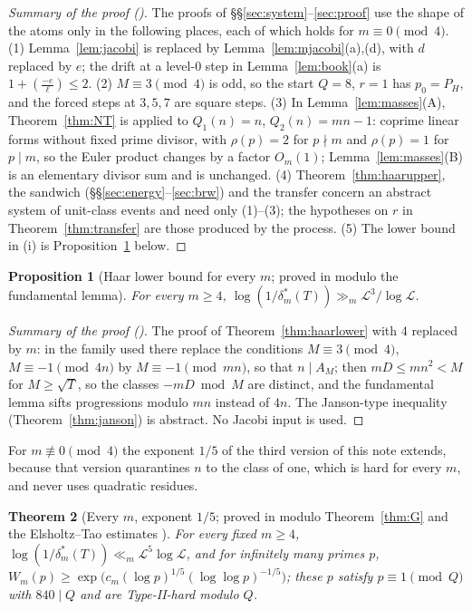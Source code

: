 \documentclass[11pt,reqno]{amsart}
\newtheorem{theorem}{Theorem}[section]
\newtheorem{proposition}[theorem]{Proposition}
\theoremstyle{definition}
\newcommand{\Lc}{\mathcal L}
\begin{document}
\begin{proof}[Summary of the proof {\rm(\cite[Thm.~3.1]{MN})}]
The proofs of \S\S\ref{sec:system}--\ref{sec:proof} use the shape of the atoms
only in the following places, each of which holds for $m\equiv0\pmod4$.
(1) Lemma~\ref{lem:jacobi} is replaced by Lemma~\ref{lem:mjacobi}(a),(d), with $d$
replaced by $e$; the drift at a level-$0$ step in Lemma~\ref{lem:book}(a) is
$1+(\frac{-e}\ell)\le2$.  (2) $M\equiv3\pmod4$ is odd, so the start $Q=8$, $r=1$ has
$p_0=P_H$, and the forced steps at $3,5,7$ are square steps.  (3) In
Lemma~\ref{lem:masses}(A), Theorem~\ref{thm:NT} is applied to $Q_1(n)=n$,
$Q_2(n)=mn-1$: coprime linear forms without fixed prime divisor, with
$\rho(p)=2$ for $p\nmid m$ and $\rho(p)=1$ for $p\mid m$, so the Euler product changes
by a factor $O_m(1)$; Lemma~\ref{lem:masses}(B) is an elementary divisor sum and is
unchanged.  (4) Theorem~\ref{thm:haarupper}, the sandwich
(\S\S\ref{sec:energy}--\ref{sec:brw}) and the transfer concern an abstract system of
unit-class events and need only (1)--(3); the hypotheses on $r$ in
Theorem~\ref{thm:transfer} are those produced by the process.  (5) The lower
bound in (i) is Proposition~\ref{prop:mlower} below.
\end{proof}

\begin{proposition}[Haar lower bound for every $m$; proved in {\cite{MN}} modulo the fundamental lemma]\label{prop:mlower}
For every $m\ge4$, $\log(1/\delta_m^*(T))\gg_m\Lc^3/\log\Lc$.
\end{proposition}

\begin{proof}[Summary of the proof {\rm(\cite[Prop.~3.2]{MN})}]
The proof of Theorem~\ref{thm:haarlower} with $4$ replaced by $m$: in the family
used there replace the conditions $M\equiv3\pmod4$, $M\equiv-1\pmod{4n}$ by
$M\equiv-1\pmod{mn}$, so that $n\mid A_M$; then $mD\le mn^2<M$ for $M\ge\sqrt T$, so the
classes $-mD\bmod M$ are distinct, and the fundamental lemma sifts
progressions modulo $mn$ instead of $4n$.  The Janson-type inequality
(Theorem~\ref{thm:janson}) is abstract.  No Jacobi input is used.
\end{proof}

For $m\not\equiv0\pmod4$ the exponent $1/5$ of the third version of this note
extends, because that version quarantines $n$ to the class of one, which is
hard for every $m$, and never uses quadratic residues.

\begin{theorem}[Every $m$, exponent $1/5$; proved in {\cite{MN}} modulo Theorem~\ref{thm:G} and the Elsholtz--Tao estimates {\cite[Prop.~1.4, Thm.~7.1, Cor.~7.4, (7.10)]{ET}}]\label{thm:mfifth}
For every fixed $m\ge4$, $\log(1/\delta_m^*(T))\ll_m\Lc^5\log\Lc$, and for infinitely many primes $p$,
$W_m(p)\ge\exp\big(c_m(\log p)^{1/5}(\log\log p)^{-1/5}\big)$; these $p$ satisfy $p\equiv1\pmod Q$ with
$840\mid Q$ and are Type-II-hard modulo $Q$.
\end{theorem}
\end{document}

